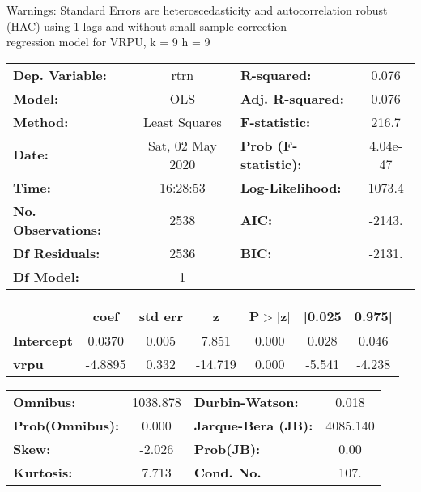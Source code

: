 Warnings: \newline
 [1] Standard Errors are heteroscedasticity and autocorrelation robust (HAC) using 1 lags and without small sample correction\\ 

regression model for VRPU, k = 9 h = 9\begin{center}
\begin{tabular}{lclc}
\toprule
\textbf{Dep. Variable:}    &       rtrn       & \textbf{  R-squared:         } &     0.076   \\
\textbf{Model:}            &       OLS        & \textbf{  Adj. R-squared:    } &     0.076   \\
\textbf{Method:}           &  Least Squares   & \textbf{  F-statistic:       } &     216.7   \\
\textbf{Date:}             & Sat, 02 May 2020 & \textbf{  Prob (F-statistic):} &  4.04e-47   \\
\textbf{Time:}             &     16:28:53     & \textbf{  Log-Likelihood:    } &    1073.4   \\
\textbf{No. Observations:} &        2538      & \textbf{  AIC:               } &    -2143.   \\
\textbf{Df Residuals:}     &        2536      & \textbf{  BIC:               } &    -2131.   \\
\textbf{Df Model:}         &           1      & \textbf{                     } &             \\
\bottomrule
\end{tabular}
\begin{tabular}{lcccccc}
                   & \textbf{coef} & \textbf{std err} & \textbf{z} & \textbf{P$> |$z$|$} & \textbf{[0.025} & \textbf{0.975]}  \\
\midrule
\textbf{Intercept} &       0.0370  &        0.005     &     7.851  &         0.000        &        0.028    &        0.046     \\
\textbf{vrpu}      &      -4.8895  &        0.332     &   -14.719  &         0.000        &       -5.541    &       -4.238     \\
\bottomrule
\end{tabular}
\begin{tabular}{lclc}
\textbf{Omnibus:}       & 1038.878 & \textbf{  Durbin-Watson:     } &    0.018  \\
\textbf{Prob(Omnibus):} &   0.000  & \textbf{  Jarque-Bera (JB):  } & 4085.140  \\
\textbf{Skew:}          &  -2.026  & \textbf{  Prob(JB):          } &     0.00  \\
\textbf{Kurtosis:}      &   7.713  & \textbf{  Cond. No.          } &     107.  \\
\bottomrule
\end{tabular}
\end{center}

